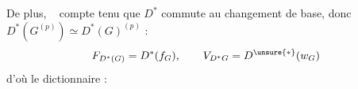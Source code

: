 De plus, \unsure{\ldots}\  compte tenu que $D^*$ commute au changement de base, donc $D^*(G^{(p)})\simeq D^*(G)^{(p)}$ :
\[
F_{D^*(G)}=D^*(f_G),\qquad V_{D^*G}=D^{\unsure{*}}(w_G)
\]
d'où le dictionnaire :
